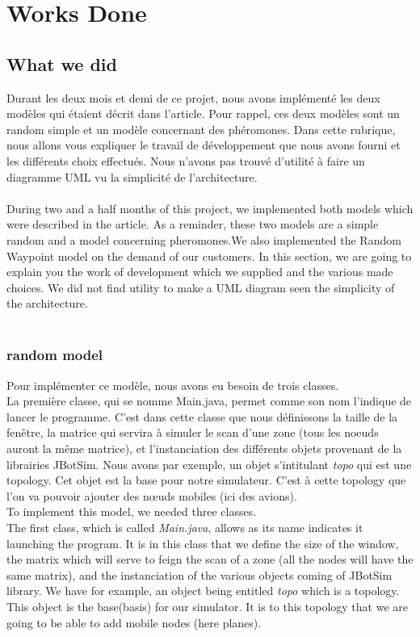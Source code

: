 \chapter{Works Done}
\section{What we did}
Durant les deux mois et demi de ce projet, nous avons implémenté les deux modèles qui étaient décrit dans l'article. Pour rappel, ces deux modèles sont un random simple et un modèle concernant des phéromones. Dans cette rubrique, nous allons vous expliquer le travail de développement que nous avons fourni et les différents choix effectués. Nous n'avons pas trouvé d'utilité à faire un diagramme UML vu la simplicité de l'architecture.\\\\

During two and a half months of this project, we implemented both models which were described in the article. As a reminder, these two models are a simple random and a model concerning pheromones.We also implemented the Random Waypoint model on the demand of our customers. In this section, we are going to explain you the work of development which we supplied and the various made choices. We did not find utility to make a UML diagram seen the simplicity of the architecture.\\\\

\subsection{random model} 

Pour implémenter ce modèle, nous avons eu besoin de trois classes.\\
La première classe, qui se nomme Main.java, permet comme son nom l'indique de lancer le programme. C'est dans cette classe que nous définissons la taille de la fenêtre, la matrice qui servira à simuler le scan d'une zone (tous les noeuds auront la même matrice), et l'instanciation des différents objets provenant de la librairies JBotSim. Nous avons par exemple, un objet s'intitulant \textit{topo} qui est une topology. Cet objet est la base pour notre simulateur. C'est à cette topology que l'on va pouvoir ajouter des nœuds mobiles (ici des avions).\\

To implement this model, we needed three classes. \\
The first class, which is called \textit{Main.java}, allows as its name indicates it launching the program. It is in this class that we define the size of the window, the matrix which will serve to feign the scan of a zone (all the nodes will have the same matrix), and the instanciation of the various objects coming of JBotSim library. We have for example, an object being entitled \textit{topo} which is a topology. This object is the base(basis) for our simulator. It is to this topology that we are going to be able to add mobile nodes (here planes). \\

